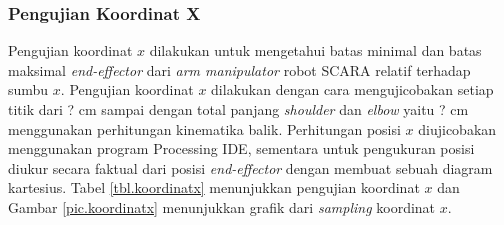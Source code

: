 \subsubsection{Pengujian Koordinat X}
 Pengujian koordinat $x$ dilakukan untuk mengetahui batas minimal dan batas maksimal \textit{end-effector} dari \textit{arm manipulator} robot SCARA relatif terhadap sumbu $x$. Pengujian koordinat $x$ dilakukan dengan cara mengujicobakan setiap titik dari ? cm sampai dengan total panjang \textit{shoulder} dan \textit{elbow} yaitu ? cm menggunakan perhitungan kinematika balik. Perhitungan posisi $x$ diujicobakan menggunakan program Processing IDE, sementara untuk pengukuran posisi diukur secara faktual dari posisi \textit{end-effector} dengan membuat sebuah diagram kartesius. Tabel \ref{tbl.koordinatx} menunjukkan pengujian koordinat $x$ dan Gambar \ref{pic.koordinatx} menunjukkan grafik dari \textit{sampling} koordinat $x$.
